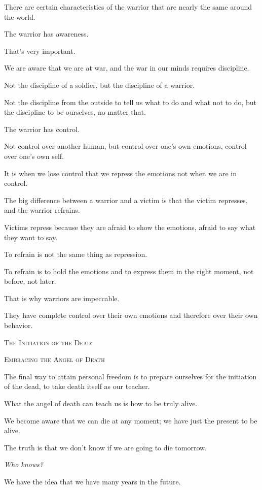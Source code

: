 \documentclass{article}
\numberwithin{equation}{section}
\begin{document}
There are certain characteristics of the warrior that are nearly the same around the world.

The warrior has awareness.

That's very important.

We are aware that we are at war, and the war in our minds requires discipline.

Not the discipline of a soldier, but the discipline of a warrior.

Not the discipline from the outside to tell us what to do and what not to do, but the discipline to be ourselves, no matter that.

%
The warrior has control.

Not control over another human, but control over one's own emotions, control over one's own self.

It is when we lose control that we repress the emotions not when we are in control.

The big difference between a warrior and a victim is that the victim represses, and the warrior refrains.

Victims repress because they are afraid to show the emotions, afraid to say what they want to say.

To refrain is not the same thing as repression.

To refrain is to hold the emotions and to express them in the right moment, not before, not later.

That is why warriors are impeccable.

They have complete control over their own emotions and therefore over their own behavior.
\begin{center}
    \textsc{The Initiation of the Dead}:
    
    \textsc{Embracing the Angel of Death}
\end{center}

The final way to attain personal freedom is to prepare ourselves for the initiation of the dead, to take death itself as our teacher.

What the angel of death can teach us is how to be truly alive.

We become aware that we can die at any moment; we have just the present to be alive.

The truth is that we don't know if we are going to die tomorrow.

\textit{Who knows?}

We have the idea that we have many years in the future.
\end{document}
